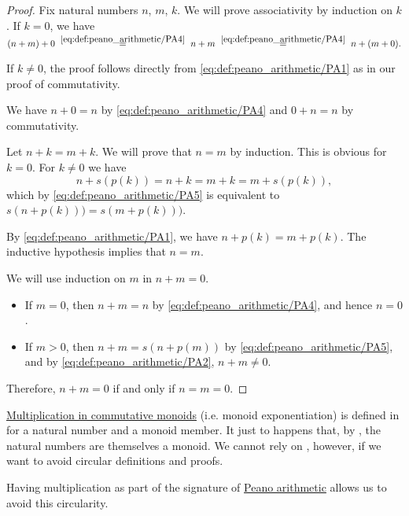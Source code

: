 \begin{proof}
   Fix natural numbers \( n \), \( m \), \( k \). We will prove associativity by induction on \( k \). If \( k = 0 \), we have
  \begin{equation*}
    (n + m) + 0
    \reloset {\eqref{eq:def:peano_arithmetic/PA4}} =
    n + m
    \reloset {\eqref{eq:def:peano_arithmetic/PA4}} =
    n + (m + 0).
  \end{equation*}

  If \( k \neq 0 \), the proof follows directly from \eqref{eq:def:peano_arithmetic/PA1} as in our proof of commutativity.

   We have \( n + 0 = n \) by \eqref{eq:def:peano_arithmetic/PA4} and \( 0 + n = n \) by commutativity.

   Let \( n + k = m + k \). We will prove that \( n = m \) by induction. This is obvious for \( k = 0 \). For \( k \neq 0 \) we have
  \begin{equation*}
    n + s(p(k))
    =
    n + k
    =
    m + k
    =
    m + s(p(k)),
  \end{equation*}
  which by \eqref{eq:def:peano_arithmetic/PA5} is equivalent to \( s(n + p(k))) = s(m + p(k))) \).

  By \eqref{eq:def:peano_arithmetic/PA1}, we have \( n + p(k) = m + p(k) \). The inductive hypothesis implies that \( n = m \).

   We will use induction on \( m \) in \( n + m = 0 \).
  \begin{itemize}
    \item If \( m = 0 \), then \( n + m = n \) by \eqref{eq:def:peano_arithmetic/PA4}, and hence \( n = 0 \).

    \item If \( m > 0 \), then \( n + m = s(n + p(m)) \) by \eqref{eq:def:peano_arithmetic/PA5}, and by \eqref{eq:def:peano_arithmetic/PA2}, \( n + m \neq 0 \).
  \end{itemize}

  Therefore, \( n + m = 0 \) if and only if \( n = m = 0 \).
\end{proof}

\begin{remark}\label{rem:natural_number_multiplication}
  \hyperref[rem:additive_semigroup/multiplication]{Multiplication in commutative monoids} (i.e. monoid exponentiation) is defined in  for a natural number and a monoid member. It just to happens that, by , the natural numbers are themselves a monoid. We cannot rely on , however, if we want to avoid circular definitions and proofs.

  Having multiplication as part of the signature of \hyperref[def:peano_arithmetic]{Peano arithmetic} allows us to avoid this circularity.
\end{remark}

